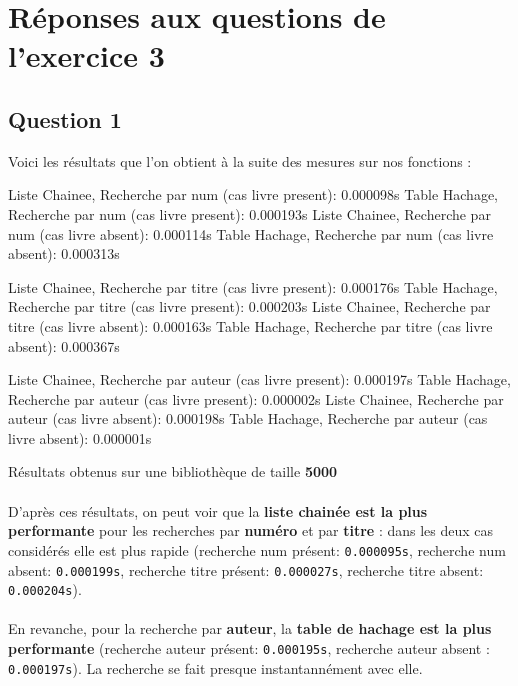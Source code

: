 \documentclass[12pt]{extarticle}
\begin{document}
\newpage
\section*{Réponses aux questions de l'exercice 3}
\subsection*{Question 1}
Voici les résultats que l'on obtient à la suite des mesures sur nos fonctions :
\begin{bashcode}
Liste Chainee, Recherche par num (cas livre present): 0.000098s
Table Hachage, Recherche par num (cas livre present): 0.000193s
Liste Chainee, Recherche par num (cas livre absent): 0.000114s
Table Hachage, Recherche par num (cas livre absent): 0.000313s

Liste Chainee, Recherche par titre (cas livre present): 0.000176s
Table Hachage, Recherche par titre (cas livre present): 0.000203s
Liste Chainee, Recherche par titre (cas livre absent): 0.000163s
Table Hachage, Recherche par titre (cas livre absent): 0.000367s

Liste Chainee, Recherche par auteur (cas livre present): 0.000197s
Table Hachage, Recherche par auteur (cas livre present): 0.000002s
Liste Chainee, Recherche par auteur (cas livre absent): 0.000198s
Table Hachage, Recherche par auteur (cas livre absent): 0.000001s
\end{bashcode} 
{\small Résultats obtenus sur une bibliothèque de taille \textbf{5000}} \\ \\
D'après ces résultats, on peut voir que la \textbf{liste chainée est la plus performante} pour les recherches par \textbf{numéro} et par \textbf{titre} : dans les deux cas considérés elle est plus rapide (recherche num présent: \texttt{0.000095s}, recherche num absent: \texttt{0.000199s}, recherche titre présent: \texttt{0.000027s}, recherche titre absent: \texttt{0.000204s}). \\ \\
En revanche, pour la recherche par \textbf{auteur}, la \textbf{table de hachage est la plus performante} (recherche auteur présent: \texttt{0.000195s}, recherche auteur absent : \texttt{0.000197s}). La recherche se fait presque instantannément avec elle.
\end{document}
